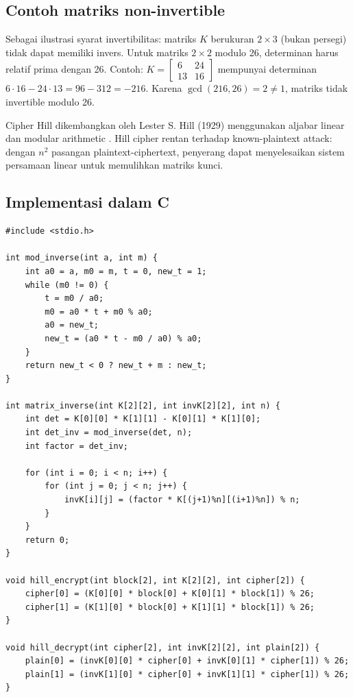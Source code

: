 \subsection{Contoh matriks non-invertible}

Sebagai ilustrasi syarat invertibilitas: matriks $K$ berukuran $2 \times 3$ (bukan persegi) tidak dapat memiliki invers. Untuk matriks $2 \times 2$ modulo 26, determinan harus relatif prima dengan 26. Contoh: $K=\begin{bmatrix}6 & 24\\ 13 & 16\end{bmatrix}$ mempunyai determinan $6 \cdot 16 - 24 \cdot 13 = 96 - 312 = -216$. Karena $\gcd(216, 26) = 2 \neq 1$, matriks tidak invertible modulo 26.

Cipher Hill dikembangkan oleh Lester S. Hill (1929) menggunakan aljabar linear dan modular arithmetic \cite{trappe2006}. Hill cipher rentan terhadap known-plaintext attack: dengan $n^2$ pasangan plaintext-ciphertext, penyerang dapat menyelesaikan sistem persamaan linear untuk memulihkan matriks kunci.

\subsection{Implementasi dalam C}

\begin{lstlisting}[style=cstyle, caption={Hill Cipher 2x2 dalam C}]
#include <stdio.h>

int mod_inverse(int a, int m) {
    int a0 = a, m0 = m, t = 0, new_t = 1;
    while (m0 != 0) {
        t = m0 / a0;
        m0 = a0 * t + m0 % a0;
        a0 = new_t;
        new_t = (a0 * t - m0 / a0) % a0;
    }
    return new_t < 0 ? new_t + m : new_t;
}

int matrix_inverse(int K[2][2], int invK[2][2], int n) {
    int det = K[0][0] * K[1][1] - K[0][1] * K[1][0];
    int det_inv = mod_inverse(det, n);
    int factor = det_inv;
    
    for (int i = 0; i < n; i++) {
        for (int j = 0; j < n; j++) {
            invK[i][j] = (factor * K[(j+1)%n][(i+1)%n]) % n;
        }
    }
    return 0;
}

void hill_encrypt(int block[2], int K[2][2], int cipher[2]) {
    cipher[0] = (K[0][0] * block[0] + K[0][1] * block[1]) % 26;
    cipher[1] = (K[1][0] * block[0] + K[1][1] * block[1]) % 26;
}

void hill_decrypt(int cipher[2], int invK[2][2], int plain[2]) {
    plain[0] = (invK[0][0] * cipher[0] + invK[0][1] * cipher[1]) % 26;
    plain[1] = (invK[1][0] * cipher[0] + invK[1][1] * cipher[1]) % 26;
}
\end{lstlisting}

